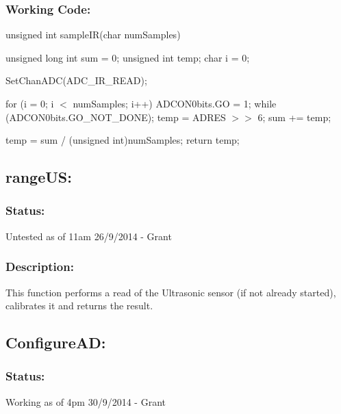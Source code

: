 \documentclass[]{article}
\begin{document}
\subsubsection{Working Code:}
unsigned int sampleIR(char numSamples) \newline
{\newline
	unsigned long int sum = 0; \newline
	unsigned int temp; \newline
	char i = 0; \newline
	
	SetChanADC(ADC\_IR\_READ); \newline
	
	for (i = 0; i $<$ numSamples; i++) \newline
	{ \newline
		ADCON0bits.GO = 1; \newline
		while (ADCON0bits.GO\_NOT\_DONE); \newline
		temp = ADRES $>>$ 6; \newline
		sum += temp; \newline
	} \newline
	
	temp = sum / (unsigned int)numSamples; \newline
	return temp; \newline
}

\subsection{rangeUS:}
\subsubsection{Status:}
Untested as of 11am 26/9/2014 - Grant

\subsubsection{Description:}
This function performs a read of the Ultrasonic sensor (if not already started), calibrates it and returns the result.

\subsection{ConfigureAD:}
\subsubsection{Status:}
Working as of 4pm 30/9/2014 - Grant
\end{document}
